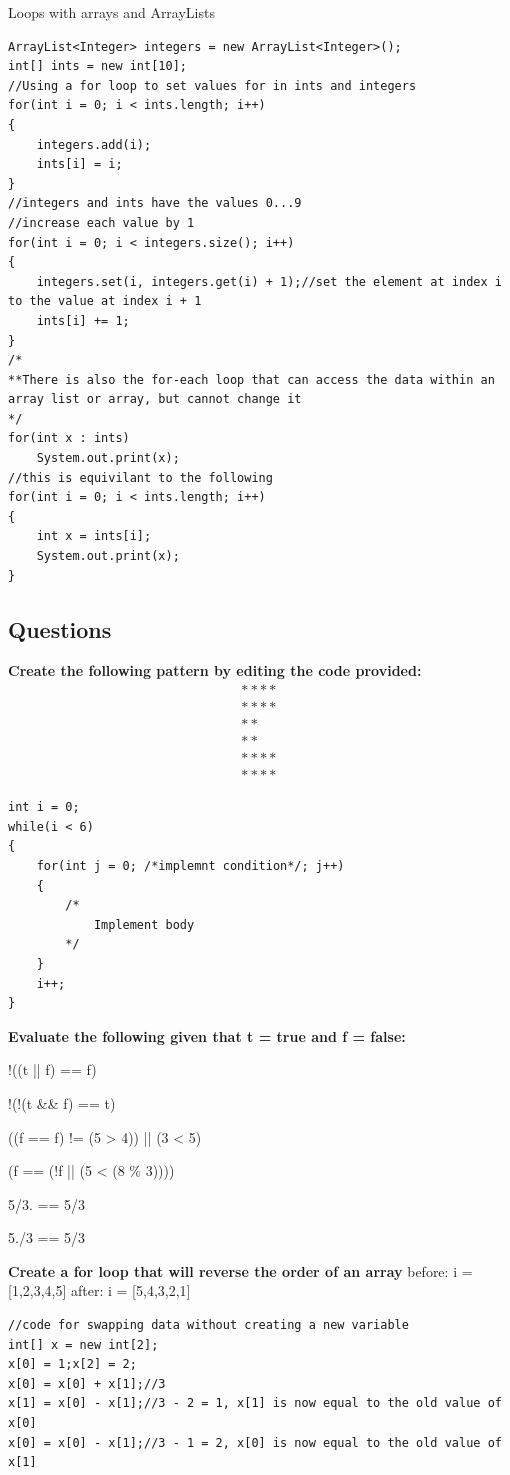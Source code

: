\documentclass{article}
\begin{document}
Loops with arrays and ArrayLists
\begin{lstlisting}
ArrayList<Integer> integers = new ArrayList<Integer>();
int[] ints = new int[10];
//Using a for loop to set values for in ints and integers
for(int i = 0; i < ints.length; i++)
{
	integers.add(i);
	ints[i] = i;
}
//integers and ints have the values 0...9
//increase each value by 1 
for(int i = 0; i < integers.size(); i++)
{
	integers.set(i, integers.get(i) + 1);//set the element at index i to the value at index i + 1
	ints[i] += 1;
}
/*
**There is also the for-each loop that can access the data within an array list or array, but cannot change it
*/
for(int x : ints)
	System.out.print(x);
//this is equivilant to the following
for(int i = 0; i < ints.length; i++)
{
	int x = ints[i];
	System.out.print(x);
}
\end{lstlisting}

\subsection{Questions}
\textbf{Create the following pattern by editing the code provided:}
\begin{align*}
****\\
****\\
**\\
**\\
****\\
****
\end{align*}
\begin{lstlisting}
int i = 0;
while(i < 6)
{
	for(int j = 0; /*implemnt condition*/; j++)
	{
		/*
			Implement body
		*/
	}
	i++;
}
\end{lstlisting}
\textbf{Evaluate the following given that t = true and f = false:}
\begin{steps}
	\item !((t || f) == f)
	\item !(!(t \&\& f) == t)
	\item ((f == f) != (5 > 4)) || (3 < 5)
	\item (f == (!f || (5 < (8 \% 3))))
	\item 5/3. == 5/3
	\item 5./3 == 5/3
\end{steps}
\textbf{Create a for loop that will reverse the order of an array}
before: i = [1,2,3,4,5]
after: i = [5,4,3,2,1]
\begin{lstlisting}
//code for swapping data without creating a new variable
int[] x = new int[2];
x[0] = 1;x[2] = 2;
x[0] = x[0] + x[1];//3
x[1] = x[0] - x[1];//3 - 2 = 1, x[1] is now equal to the old value of x[0]
x[0] = x[0] - x[1];//3 - 1 = 2, x[0] is now equal to the old value of x[1]
\end{lstlisting}
\end{document}
